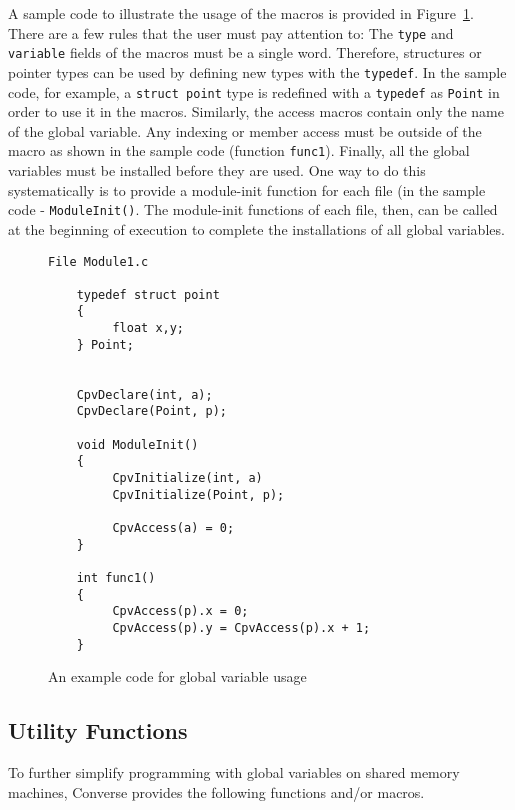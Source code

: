 A sample code to illustrate the usage of the macros is provided
in Figure~\ref{fig:cpv}.
There are a few rules that the user must pay attention to: The
{\tt type} and {\tt variable} fields of the macros must be a single
word. Therefore, structures or pointer types can be used by defining
new types with the {\tt typedef}. In the sample code, for example,
a {\tt struct point} type is redefined with a {\tt typedef} as {\tt Point}
in order to use it in the macros. Similarly,  the access macros contain
only the name of the global variable. Any indexing or member access
must be outside of the macro as shown in the sample code 
(function {\tt func1}). Finally, all the global variables must be
installed before they are used. One way to do this systematically is
to provide a module-init function for each file (in the sample code - 
{\tt ModuleInit()}. The module-init functions of each file, then, can be 
called at the beginning of execution to complete the installations of 
all global variables.

\begin{figure}
\begin{verbatim}
File Module1.c

    typedef struct point
    {
         float x,y;
    } Point;


    CpvDeclare(int, a);
    CpvDeclare(Point, p);

    void ModuleInit()
    {
         CpvInitialize(int, a)
         CpvInitialize(Point, p);

         CpvAccess(a) = 0;
    }

    int func1() 
    {
         CpvAccess(p).x = 0;
         CpvAccess(p).y = CpvAccess(p).x + 1;
    }
\end{verbatim}
\caption{An example code for global variable usage}
\label{fig:cpv}
\end{figure}

\subsection{Utility Functions}
\label{utility}

To further simplify programming with global variables on shared memory
machines, Converse provides the following functions and/or
macros. 


